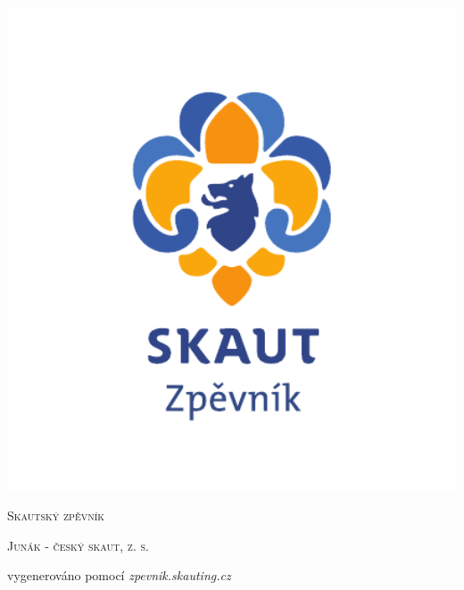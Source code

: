 \documentclass[12pt, a4paper]{report}
\begin{document}
\begin{titlepage}
	{\centering
	\includegraphics[width=1\textwidth]{Logo/Logo2-barevne.pdf}\par\vspace{1cm}
	{\scshape\LARGE Skautský zpěvník \par}
	\vspace{1cm}
	{\scshape\normalsize Junák - český skaut, z. s.\par}}

	\vfill

	{\setmainfont{TheMix C5 SemiLight}\footnotesize vygenerováno pomocí \textit{zpevnik.skauting.cz}}

\end{titlepage}
\end{document}
